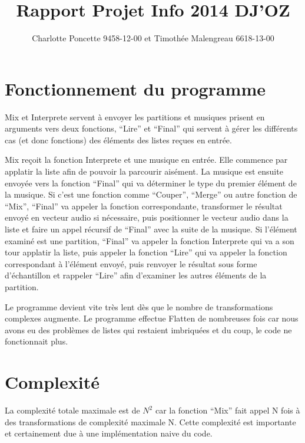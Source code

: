 \documentclass[a4paper,10pt]{article}
\title{Rapport Projet Info 2014 DJ'OZ}
\author{Charlotte Poncette 9458-12-00 et Timothée Malengreau 6618-13-00}
\begin{document}
\maketitle

\section{Fonctionnement du programme}

Mix et Interprete servent à envoyer les partitions et musiques prisent en arguments vers deux fonctions, ``Lire'' et ``Final'' qui servent à gérer
les différents cas (et donc fonctions) des éléments des listes reçues en entrée.
\bigskip

Mix reçoit la fonction Interprete et une musique en entrée. Elle commence par applatir la liste afin de pouvoir la parcourir aisément.
La musique est ensuite envoyée vers la fonction ``Final'' qui va déterminer le type du premier élément de la musique. Si c'est une fonction 
comme ``Couper'', ``Merge'' ou autre fonction de ``Mix'', ``Final'' va appeler la fonction correspondante, transformer le résultat envoyé 
en vecteur audio si nécessaire, puis positionner le vecteur audio dans la liste et faire un appel récursif de ``Final'' avec la suite de la musique.
Si l'élément examiné est une partition, ``Final''  va appeler la fonction Interprete qui va a son tour applatir la liste, puis appeler la fonction
``Lire'' qui va appeler la fonction correspondant à l'élément envoyé, puis renvoyer le résultat sous forme d'échantillon et rappeler ``Lire'' afin
d'examiner les autres éléments de la partition. 
\bigskip

Le programme devient vite très lent dès que le nombre de transformations complexes augmente. Le programme effectue Flatten de nombreuses fois car
nous avons eu des problèmes de listes qui restaient imbriquées et du coup, le code ne fonctionnait plus.

\section{Complexité}

La complexité totale maximale est de $N^2$ car la fonction ``Mix'' fait appel N fois à des transformations de complexité maximale N. 
Cette complexité est importante et certainement due à une implémentation naive du code. 
\end{document}
